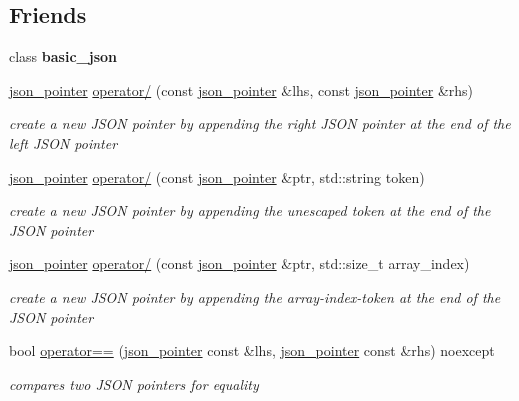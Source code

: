 \subsection*{Friends}
\begin{DoxyCompactItemize}
\item 
\mbox{\label{classnlohmann_1_1json__pointer_ada3100cdb8700566051828f1355fa745}} 
class {\bfseries basic\+\_\+json}
\item 
\hyperlink{classnlohmann_1_1json__pointer}{json\+\_\+pointer} \hyperlink{classnlohmann_1_1json__pointer_a90a11fe6c7f37b1746a3ff9cb24b0d53}{operator/} (const \hyperlink{classnlohmann_1_1json__pointer}{json\+\_\+pointer} \&lhs, const \hyperlink{classnlohmann_1_1json__pointer}{json\+\_\+pointer} \&rhs)
\begin{DoxyCompactList}\small\item\em create a new J\+S\+ON pointer by appending the right J\+S\+ON pointer at the end of the left J\+S\+ON pointer \end{DoxyCompactList}\item 
\hyperlink{classnlohmann_1_1json__pointer}{json\+\_\+pointer} \hyperlink{classnlohmann_1_1json__pointer_a926c9065dbed1bedc17857a813f7a46f}{operator/} (const \hyperlink{classnlohmann_1_1json__pointer}{json\+\_\+pointer} \&ptr, std\+::string token)
\begin{DoxyCompactList}\small\item\em create a new J\+S\+ON pointer by appending the unescaped token at the end of the J\+S\+ON pointer \end{DoxyCompactList}\item 
\hyperlink{classnlohmann_1_1json__pointer}{json\+\_\+pointer} \hyperlink{classnlohmann_1_1json__pointer_a9f6bc6f4d4668b4e9a19d8b8ac29da4f}{operator/} (const \hyperlink{classnlohmann_1_1json__pointer}{json\+\_\+pointer} \&ptr, std\+::size\+\_\+t array\+\_\+index)
\begin{DoxyCompactList}\small\item\em create a new J\+S\+ON pointer by appending the array-\/index-\/token at the end of the J\+S\+ON pointer \end{DoxyCompactList}\item 
bool \hyperlink{classnlohmann_1_1json__pointer_a4667ef558c8c3f8a646bfda0c6654653}{operator==} (\hyperlink{classnlohmann_1_1json__pointer}{json\+\_\+pointer} const \&lhs, \hyperlink{classnlohmann_1_1json__pointer}{json\+\_\+pointer} const \&rhs) noexcept
\begin{DoxyCompactList}\small\item\em compares two J\+S\+ON pointers for equality \end{DoxyCompactList}\item 

\end{DoxyCompactItemize}
